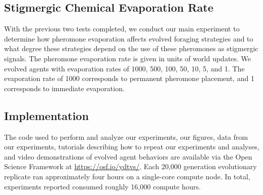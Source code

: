 \subsection*{Stigmergic Chemical Evaporation Rate}

With the previous two tests completed, we conduct our main experiment to determine how pheromone evaporation affects evolved foraging strategies and to what degree these strategies depend on the use of these pheromones as stigmergic signals. The pheromone evaporation rate is given in units of world updates. We evolved agents with evaporation rates of 1000, 500, 100, 50, 10, 5, and 1. The evaporation rate of 1000 corresponds to permanent pheromone placement, and 1 corresponds to immediate evaporation.

\subsection*{Implementation}

The code used to perform and analyze our experiments, our figures, data from our experiments, tutorials describing how to repeat our experiments and analyses, and video demonstrations of evolved agent behaviors are available via the Open Science Framework at \url{https://osf.io/ydtvs/}.
Each 20,000 generation evolutionary replicate ran approximately four hours on a single-core compute node.
In total, experiments reported consumed roughly 16,000 compute hours.
